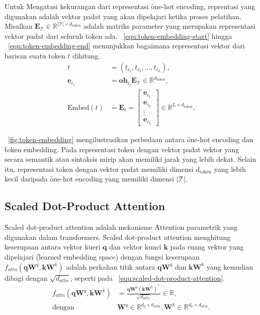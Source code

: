 	Untuk Mengatasi kekurangan dari representasi \f{one-hot encoding}, reprentasi yang digunakan adalah vektor padat yang akan dipelajari ketika proses pelatihan. Misalkan $\mathbf{E}_{\mathcal{T}} \in \mathbb{R}^{|\mathcal{T}| \times d_{\text{token}}}$ adalah matriks parameter yang merupakan representasi vektor padat dari seluruh token ada. \equ~\ref{equ:token-embedding-start} hingga \equ~\ref{equ:token-embedding-end} menunjukkan bagaimana representasi vektor dari barisan suatu token $t$ dihitung. 
	\begin{align}
		\label{equ:token-embedding-start}
		t &= (t_{i_1}, t_{i_2}, \dots, t_{i_L}), \\
		\mathbf{e}_{i_j} &= \mathbf{oh}_{i_j} \mathbf{E}_{\mathcal{T}} \in \mathbb{R}^{d_{\text{token}}}, \\
		\label{equ:token-embedding-end}
		\text{Embed}(t) &= \mathbf{E}_{t} = \begin{bmatrix}
			\mathbf{e}_{i_1} \\
			\mathbf{e}_{i_2} \\
			\vdots \\
			\mathbf{e}_{i_L}
		\end{bmatrix} \in \mathbb{R}^{L \times d_{\text{token}}}.
	\end{align}

	\pic~\ref{fig:token-embedding} mengilustrasikan perbedaan antara \f{one-hot encoding} dan \f{token embedding}. Pada representasi token dengan vektor padat vektor yang secara semantik atau sintaksis mirip akan memiliki jarak yang lebih dekat. Selain itu, representasi token dengan vektor padat memiliki dimensi $d_{\text{token}}$ yang lebih kecil daripada \f{one-hot encoding} yang memiliki dimensi $|\mathcal{T}|$.

	\subsection{\f{Scaled Dot-Product Attention}}
	\label{sec:scaled-dot-product-attention}

	\f{Scaled dot-product attention} adalah mekanisme \f{Attention} parametrik yang digunakan dalam \f{transformers}. \f{Scaled dot-product attention} menghitung keserupaan antara vektor kueri $\mathbf{q}$ dan vektor kunci $\mathbf{k}$ pada ruang vektor yang dipelajari (\f{learned embedding space}) dengan fungsi keserupaan $f_{attn}(\mathbf{q} \mathbf{W}^q, \mathbf{k}\mathbf{W}^k) $ adalah perkalian titik antara $\mathbf{qW}^q$ dan $\mathbf{kW}^k$ yang kemudian dibagi dengan $\sqrt{d_{attn}}$, seperti pada \equ~\ref{equ:scaled-dot-product-attention}.
	\begin{align}
		\label{equ:scaled-dot-product-attention}
		f_{attn}(\mathbf{q} \mathbf{W}^q, \mathbf{k} \mathbf{W}^k) &= \frac{\mathbf{q} \mathbf{W}^q (\mathbf{k} \mathbf{W}^k)^{\top}}{\sqrt{d_{attn}}} \in \mathbb{R}, \\
		\text{dengan } &\mathbf{W}^q \in \mathbb{R}^{d_q \times d_{\text{attn}}}, \mathbf{W}^k \in \mathbb{R}^{d_k \times d_{\text{attn}}}.
	\end{align}

